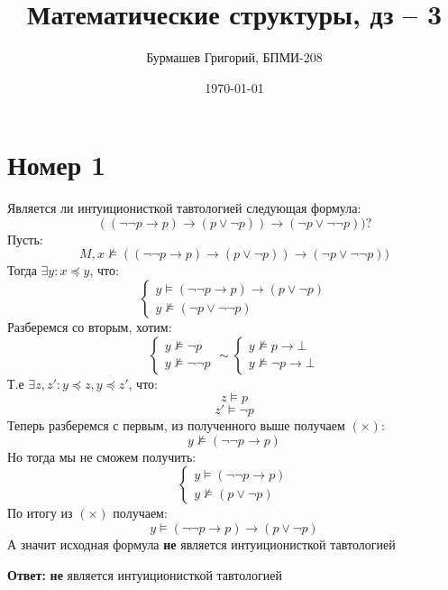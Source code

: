 \documentclass[a4paper,12pt]{article}
\author{Бурмашев Григорий, БПМИ-208}
\title{Математические структуры, дз -- 3}
\date{\today}
\begin{document}
\maketitle
\clearpage
\section*{Номер 1}
Является ли интуиционисткой тавтологией следующая формула:
\[
(
	(
	\neg \neg p
	\rightarrow 
	p
	)
\rightarrow
	(
	p \vee \neg p
	)
)
\rightarrow
	(
	\neg p \vee \neg \neg p
	)
)?
\]
Пусть:
\[
M, x \not \models
(
	(
	\neg \neg p
	\rightarrow 
	p
	)
\rightarrow
	(
	p \vee \neg p
	)
)
\rightarrow
	(
	\neg p \vee \neg \neg p
	)
)
\]
Тогда $\exists y : x \preceq  y$, что:
\[
\begin{cases}
	y\models (\neg \neg p \to p) \to (p \vee \neg p) \\
	y \not \models (\neg p \vee \neg \neg p)
\end{cases}
\]
Разберемся со вторым, хотим:
\[
\begin{cases}
y \not \models \neg p \\
y \not \models \neg \neg p
\end{cases}
\sim
\begin{cases}
y \not \models p  \rightarrow  \bot \\
y \not \models \neg p \rightarrow \bot
\end{cases}
\]
Т.е $\exists z , z' : y \preceq  z, y \preceq z'$, что:
\[
z \models p
\]
\[
z' \models \neg p
\]
Теперь разберемся с первым, из полученного выше получаем $(\times)$:
\[
y \not \models (\neg \neg p \rightarrow p) 
\]
Но тогда мы не сможем получить:
\[
\begin{cases}
y \models (\neg \neg p \rightarrow p) \\
y \not \models (p \vee \neg p)
\end{cases}
\]
По итогу из $(\times)$ получаем:
\[
y\models (\neg \neg p \to p) \to (p \vee \neg p)
\]
А значит исходная формула \textbf{не} является интуиционисткой тавтологией
\begin{center}
\textbf{Ответ: } \textbf{не} является интуиционисткой тавтологией
\end{center}
\end{document}
